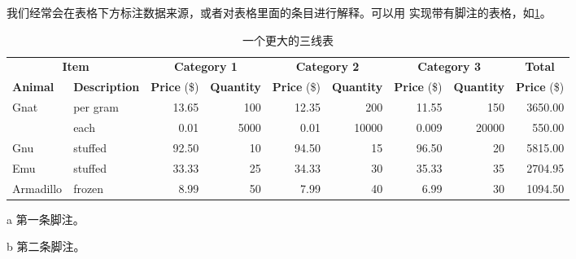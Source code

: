 我们经常会在表格下方标注数据来源，或者对表格里面的条目进行解释。可以用
 实现带有脚注的表格，如\cref{tab:bigtable}。

\begin{table}[!htb]
  \centering
  \begin{threeparttable}[b]
    \caption{一个更大的三线表}
    \label{tab:bigtable}
    \begin{tabular}{@{}llrrrrrrr@{}} \toprule
      \multicolumn{2}{c}{\textbf{Item}} & \multicolumn{2}{c}{\textbf{Category 1}} & \multicolumn{2}{c}{\textbf{Category 2}} & \multicolumn{2}{c}{\textbf{Category 3}} & \multicolumn{1}{c}{\textbf{Total}}                                                                                     \\ \cmidrule(r){1-2} \cmidrule(lr){3-4} \cmidrule(lr){5-6} \cmidrule(lr){7-8} \cmidrule(l){9-9}
      \textbf{Animal}                   & \textbf{Description}                    & \textbf{Price} (\$)                     & \textbf{Quantity}                       & \textbf{Price} (\$)                & \textbf{Quantity} & \textbf{Price} (\$) & \textbf{Quantity} & \textbf{Price} (\$) \\ \midrule
      Gnat                              & per gram\tnote{a}                       & 13.65                                   & 100                                     & 12.35                              & 200               & 11.55               & 150               & 3650.00             \\
                                        & each                                    & 0.01                                    & 5000                                    & 0.01                               & 10000             & 0.009               & 20000             & 550.00              \\
      Gnu                               & stuffed                                 & 92.50                                   & 10                                      & 94.50                              & 15                & 96.50               & 20                & 5815.00             \\
      Emu                               & stuffed                                 & 33.33                                   & 25                                      & 34.33                              & 30                & 35.33               & 35                & 2704.95             \\
      Armadillo                         & frozen                                  & 8.99                                    & 50                                      & 7.99                               & 40                & 6.99                & 30\tnote{b}       & 1094.50             \\ \bottomrule
    \end{tabular}
    \begin{tablenotes}
      \item [a] 第一条脚注。
      \item [b] 第二条脚注。
    \end{tablenotes}
  \end{threeparttable}
\end{table}

